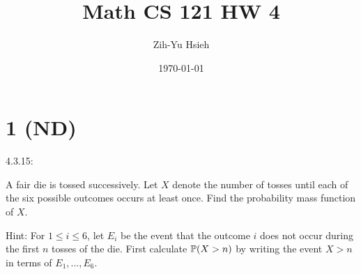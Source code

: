 \documentclass{article}
\title{Math CS 121 HW 4}
\author{Zih-Yu Hsieh}
\date{\today}
\begin{document}
\maketitle

\section*{1 (ND)}
\begin{ques}\label{q1}
    4.3.15:

    A fair die is tossed successively. Let $X$ denote the number of tosses until each of the six possible outcomes occurs at least once. Find the probability mass function of $X$.

    Hint: For $1\leq i\leq 6$, let $E_i$ be the event that the outcome $i$ does not occur during the first $n$ tosses of the die. First calculate $\mathbb{P}(X>n)$ by writing the event $X>n$ in terms of $E_1,...,E_6$.
\end{ques}
\end{document}
